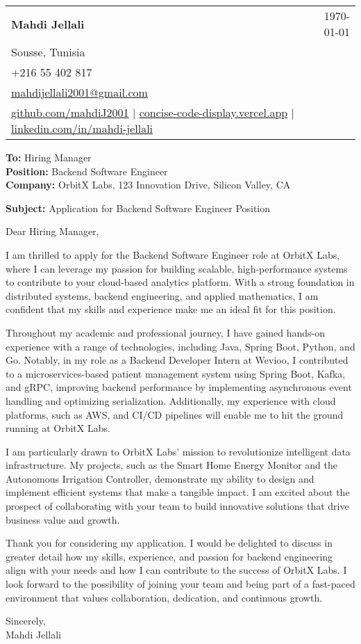 \documentclass[letterpaper,11pt]{article}
\makeatletter
\newcommand{\letterHeading}[5]{
    \begin{tabular*}{\textwidth}{l@{\extracolsep{\fill}}r}
    \textbf{\Large #1} & #5 \\  %
    #2 & \\
    #3 & \\
    #4 & \\
    \end{tabular*}
    \vspace{15pt}
}
\newcommand{\letterRecipient}[3]{
    \textbf{\large To:} #1 \\
    \textbf{\large Position:} #2 \\
    \textbf{\large Company:} #3 \\
    \vspace{12pt}
}
\newcommand{\letterSubject}[1]{
    \textbf{\large Subject:} #1 \\
    \vspace{15pt}
}
\makeatother
\begin{document}
    \letterHeading
    {Mahdi Jellali}
    {Sousse, Tunisia}
    {+216 55 402 817 \\ \href{mailto:mahdijellali2001@gmail.com}{mahdijellali2001@gmail.com}}
    {\href{https://github.com/mahdiJ2001}{github.com/mahdiJ2001} $|$ \href{https://concise-code-display.vercel.app/}{concise-code-display.vercel.app} $|$ \href{https://www.linkedin.com/in/mahdi-jellali/}{linkedin.com/in/mahdi-jellali}}
    {\today}

    \letterRecipient
    {Hiring Manager}
    {Backend Software Engineer}
    {OrbitX Labs, 123 Innovation Drive, Silicon Valley, CA}

    \letterSubject{Application for Backend Software Engineer Position}

    Dear Hiring Manager,

    I am thrilled to apply for the Backend Software Engineer role at OrbitX Labs, where I can leverage my passion for building scalable, high-performance systems to contribute to your cloud-based analytics platform. With a strong foundation in distributed systems, backend engineering, and applied mathematics, I am confident that my skills and experience make me an ideal fit for this position.

    Throughout my academic and professional journey, I have gained hands-on experience with a range of technologies, including Java, Spring Boot, Python, and Go. Notably, in my role as a Backend Developer Intern at Wevioo, I contributed to a microservices-based patient management system using Spring Boot, Kafka, and gRPC, improving backend performance by implementing asynchronous event handling and optimizing serialization. Additionally, my experience with cloud platforms, such as AWS, and CI/CD pipelines will enable me to hit the ground running at OrbitX Labs.

    I am particularly drawn to OrbitX Labs' mission to revolutionize intelligent data infrastructure. My projects, such as the Smart Home Energy Monitor and the Autonomous Irrigation Controller, demonstrate my ability to design and implement efficient systems that make a tangible impact. I am excited about the prospect of collaborating with your team to build innovative solutions that drive business value and growth.

    Thank you for considering my application. I would be delighted to discuss in greater detail how my skills, experience, and passion for backend engineering align with your needs and how I can contribute to the success of OrbitX Labs. I look forward to the possibility of joining your team and being part of a fast-paced environment that values collaboration, dedication, and continuous growth.

    Sincerely,\\[12pt]

    Mahdi Jellali
\end{document}

